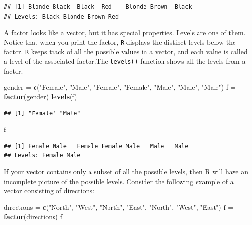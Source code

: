 \documentclass[
]{book}
\newenvironment{Shaded}{\begin{snugshade}}{\end{snugshade}}
\newcommand{\KeywordTok}[1]{\textcolor[rgb]{0.13,0.29,0.53}{\textbf{#1}}}
\newcommand{\NormalTok}[1]{#1}
\newcommand{\StringTok}[1]{\textcolor[rgb]{0.31,0.60,0.02}{#1}}
\begin{document}
\begin{verbatim}
## [1] Blonde Black  Black  Red    Blonde Brown  Black 
## Levels: Black Blonde Brown Red
\end{verbatim}

A factor looks like a vector, but it has special properties. Levels are one of them. Notice that when you print the factor, \texttt{R} displays the distinct levels below the factor. \texttt{R} keeps track of all the possible values in a vector, and each value is called a level of the associated factor.The \texttt{levels()} function shows all the levels from a factor.

\begin{Shaded}
\begin{Highlighting}[]
\NormalTok{gender =}\StringTok{ }\KeywordTok{c}\NormalTok{(}\StringTok{"Female"}\NormalTok{, }\StringTok{"Male"}\NormalTok{, }\StringTok{"Female"}\NormalTok{, }\StringTok{"Female"}\NormalTok{, }\StringTok{"Male"}\NormalTok{, }\StringTok{"Male"}\NormalTok{, }\StringTok{"Male"}\NormalTok{)}
\NormalTok{f =}\StringTok{ }\KeywordTok{factor}\NormalTok{(gender)}
\KeywordTok{levels}\NormalTok{(f)}
\end{Highlighting}
\end{Shaded}

\begin{verbatim}
## [1] "Female" "Male"
\end{verbatim}

\begin{Shaded}
\begin{Highlighting}[]
\NormalTok{f}
\end{Highlighting}
\end{Shaded}

\begin{verbatim}
## [1] Female Male   Female Female Male   Male   Male  
## Levels: Female Male
\end{verbatim}

If your vector contains only a subset of all the possible levels, then R will have an incomplete picture of the possible levels. Consider the following example of a vector consisting of directions:

\begin{Shaded}
\begin{Highlighting}[]
\NormalTok{directions =}\StringTok{ }\KeywordTok{c}\NormalTok{(}\StringTok{"North"}\NormalTok{, }\StringTok{"West"}\NormalTok{, }\StringTok{"North"}\NormalTok{, }\StringTok{"East"}\NormalTok{, }\StringTok{"North"}\NormalTok{, }\StringTok{"West"}\NormalTok{, }\StringTok{"East"}\NormalTok{)}
\NormalTok{f =}\StringTok{ }\KeywordTok{factor}\NormalTok{(directions)}
\NormalTok{f}
\end{Highlighting}
\end{Shaded}
\end{document}
